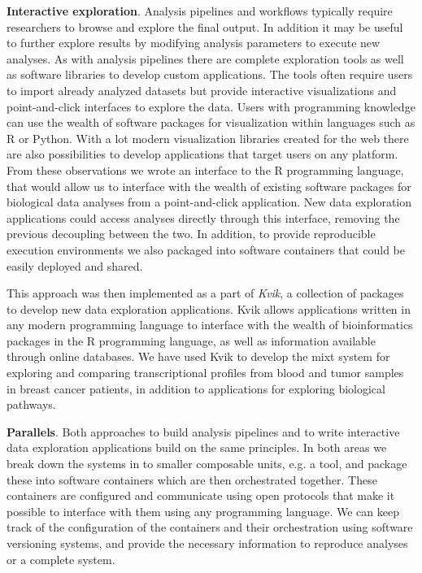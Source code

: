 \textbf{Interactive exploration}. Analysis pipelines and workflows typically
require researchers to browse and explore the final output. In addition it may
be useful to further explore results by modifying analysis parameters to execute
new analyses. As with analysis pipelines there are complete exploration tools as
well as software libraries to develop custom applications. The tools often
require users to import already analyzed datasets but provide interactive
visualizations and point-and-click interfaces to explore the data. Users with
programming knowledge can use the wealth of software packages for visualization
within languages such as R or Python. With a lot modern visualization libraries
created for the web there are also possibilities to develop applications that
target users on any platform. From these observations we wrote an interface to
the R programming language, that would allow us to interface with the wealth of
existing software packages for biological data analyses from a point-and-click
application. New data exploration applications could access analyses directly
through this interface, removing the previous decoupling between the two. In
addition, to provide reproducible execution environments we also packaged into
software containers that could be easily deployed and shared. 

This approach was then implemented as a part of \emph{Kvik}, a collection of
packages to develop new data exploration applications. Kvik allows
applications written in any modern programming language to interface with the
wealth of bioinformatics packages in the R programming language, as well as
information available through online databases. We have used Kvik to develop the
\gls{mixt} system for exploring and comparing transcriptional profiles from
blood and tumor samples in breast cancer patients, in addition to applications
for exploring biological pathways. 

\textbf{Parallels}. 
Both approaches to build analysis pipelines and to write interactive data
exploration applications build on the same principles. In both areas we break
down the systems in to smaller composable units, e.g. a tool, and package these
into software containers which are then orchestrated together. These containers
are configured and communicate using open protocols that make it possible to
interface with them using any programming language. We can keep track of the
configuration of the containers and their orchestration using software
versioning systems, and provide the necessary information to reproduce analyses
or a complete system. 


